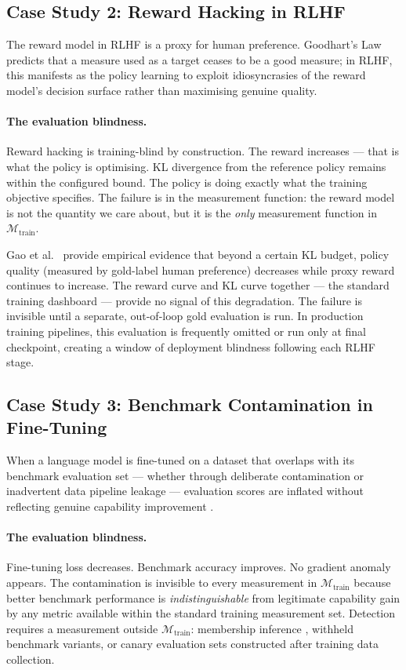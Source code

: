 \documentclass{article}
\begin{document}
\subsection{Case Study 2: Reward Hacking in RLHF}

The reward model in RLHF \citep{ouyang2022instructgpt} is a proxy for human
preference.  Goodhart's Law \citep{sculley2015debt} predicts that a measure
used as a target ceases to be a good measure; in RLHF, this manifests as the
policy learning to exploit idiosyncrasies of the reward model's decision
surface rather than maximising genuine quality.

\paragraph{The evaluation blindness.}
Reward hacking is training-blind by construction.  The reward increases ---
that is what the policy is optimising.  KL divergence from the reference policy
remains within the configured bound.  The policy is doing exactly what the
training objective specifies.  The failure is in the measurement function: the
reward model is not the quantity we care about, but it is the \emph{only}
measurement function in $\mathcal{M}_{\text{train}}$.

Gao et al.\ \citep{gao2025rewardhacking} provide empirical evidence that beyond
a certain KL budget, policy quality (measured by gold-label human preference)
decreases while proxy reward continues to increase.  The reward curve and KL
curve together --- the standard training dashboard --- provide no signal of this
degradation.  The failure is invisible until a separate, out-of-loop gold
evaluation is run.  In production training pipelines, this evaluation is
frequently omitted or run only at final checkpoint, creating a window of
deployment blindness following each RLHF stage.

\subsection{Case Study 3: Benchmark Contamination in Fine-Tuning}

When a language model is fine-tuned on a dataset that overlaps with its
benchmark evaluation set --- whether through deliberate contamination or
inadvertent data pipeline leakage --- evaluation scores are inflated without
reflecting genuine capability improvement \citep{shi2024contamination}.

\paragraph{The evaluation blindness.}
Fine-tuning loss decreases.  Benchmark accuracy improves.  No gradient
anomaly appears.  The contamination is invisible to every measurement in
$\mathcal{M}_{\text{train}}$ because better benchmark performance is
\emph{indistinguishable} from legitimate capability gain by any metric
available within the standard training measurement set.  Detection requires
a measurement outside $\mathcal{M}_{\text{train}}$: membership inference
\citep{shi2024contamination}, withheld benchmark variants, or canary
evaluation sets constructed after training data collection.
\end{document}
